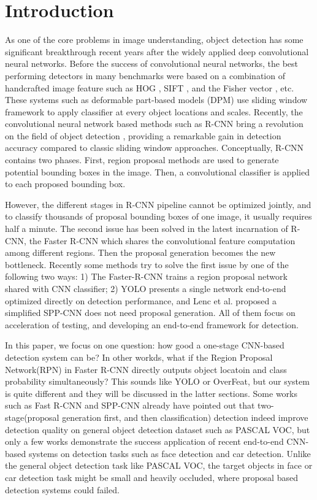  
\section{Introduction}

As one of the core problems in image understanding, object detection has some significant breakthrough recent years after the widely applied deep convolutional neural networks. Before the success of convolutional neural networks, the best performing detectors in many benchmarks were based on a combination of handcrafted image feature such as HOG\cite{dalal2005histograms} , SIFT\cite{lowe2004distinctive} , and the Fisher vector\cite{cinbis2013segmentation} , etc. These systems such as deformable part-based models (DPM)\cite{felzenszwalb2010object} use sliding window framework to apply classifier at every object locations and scales. Recently, the convolutional neural network based methods such as R-CNN\cite{girshick2014rich,girshick2015fast} bring a revolution on the field of object detection , providing a remarkable gain in detection accuracy compared to classic sliding window approaches. Conceptually, R-CNN contains two phases. First, region proposal methods are used to generate potential bounding boxes in the image. Then, a convolutional classifier is applied to each proposed bounding box. 

However, the different stages in R-CNN pipeline cannot be optimized jointly, and to classify thousands of proposal bounding boxes of one image, it usually requires half a minute. The second issue has been solved in the latest incarnation of R-CNN, the Faster R-CNN\cite{ren2015faster} which shares the convolutional feature computation among different regions. Then the proposal generation becomes the new bottleneck. Recently some methods try to solve the first issue by one of the following two ways: 1) The Faster-R-CNN trains a region proposal network shared with CNN classifier; 2) YOLO\cite{YOLO}  presents a single network end-to-end optimized directly on detection performance, and Lenc et al.\cite{LencV15} proposed a simplified SPP-CNN does not need proposal generation. All of them focus on acceleration of testing, and developing an end-to-end framework for detection. 

In this paper, we  focus on one question: how good a one-stage CNN-based detection system can be?  In other workds, what if the Region Proposal Network(RPN) in Faster R-CNN directly outputs object locatoin and class probability simultaneously? This sounds like YOLO or OverFeat\cite{sermanet2013overfeat}, but our system is quite different and they will be discussed in the latter sections. Some works such as Fast R-CNN\cite{girshick2015fast}  and SPP-CNN already have pointed out that two-stage(proposal generation first, and then classification) detection indeed improve detection quality on general object detection dataset such as PASCAL VOC, but only a few works\cite{farfade2015multi} demonstrate the success application of recent end-to-end CNN-based systems on detection tasks such as face detection and car detection. Unlike the general object detection task like PASCAL VOC, the target objects in face or car detection task might be small and heavily occluded, where proposal based detection systems could failed. 


